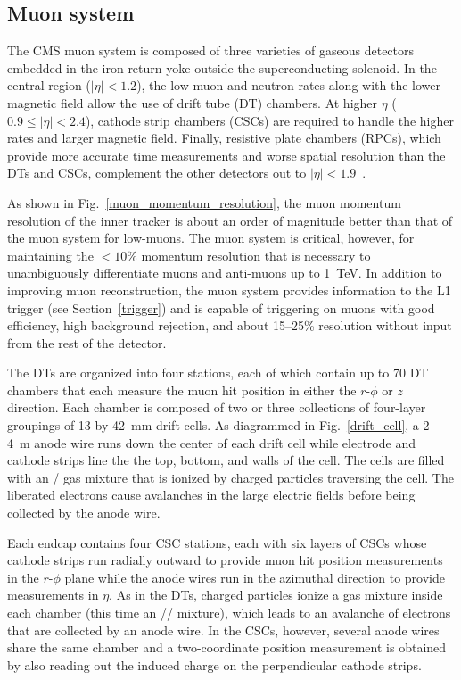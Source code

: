 

\subsection{Muon system}
The CMS muon system is composed of three varieties of gaseous detectors embedded in the iron return yoke outside the superconducting solenoid. In the central region ($|\eta|<1.2$), the low muon and neutron rates along with the lower magnetic field allow the use of drift tube (DT) chambers. At higher $\eta$ ($0.9\leq|\eta|<2.4$), cathode strip chambers (CSCs) are required to handle the higher rates and larger magnetic field. Finally, resistive plate chambers (RPCs), which provide more accurate time measurements and worse spatial resolution than the DTs and CSCs, complement the other detectors out to $|\eta|<1.9$~\cite{cms_tdr_v1, cms_ms_performance}.

As shown in Fig.~\ref{muon_momentum_resolution}, the muon momentum resolution of the inner tracker is about an order of magnitude better than that of the muon system for low-\pt muons. The muon system is critical, however, for maintaining the $<10\%$ momentum resolution that is necessary to unambiguously differentiate muons and anti-muons up to \SI{1}{\TeV}. In addition to improving muon reconstruction, the muon system provides information to the L1 trigger (see Section~\ref{trigger}) and is capable of triggering on muons with good efficiency, high background rejection, and about 15--25\% \pt resolution without input from the rest of the detector.



The DTs are organized into four stations, each of which contain up to 70 DT chambers that each measure the muon hit position in either the $r$-$\phi$ or $z$ direction. Each chamber is composed of two or three collections of four-layer groupings of \num{13} by \SI{42}{\mm} drift cells. As diagrammed in Fig.~\ref{drift_cell}, a \si{2}--\SI{4}{\m} anode wire runs down the center of each drift cell while electrode and cathode strips line the the top, bottom, and walls of the cell. The cells are filled with an / gas mixture that is ionized by charged particles traversing the cell. The liberated electrons cause avalanches in the large electric fields before being collected by the anode wire.



Each endcap contains four CSC stations, each with six layers of CSCs whose cathode strips run radially outward to provide muon hit position measurements in the $r$-$\phi$ plane while the anode wires run in the azimuthal direction to provide measurements in $\eta$. As in the DTs, charged particles ionize a gas mixture inside each chamber (this time an // mixture), which leads to an avalanche of electrons that are collected by an anode wire. In the CSCs, however, several anode wires share the same chamber and a two-coordinate position measurement is obtained by also reading out the induced charge on the perpendicular cathode strips.


